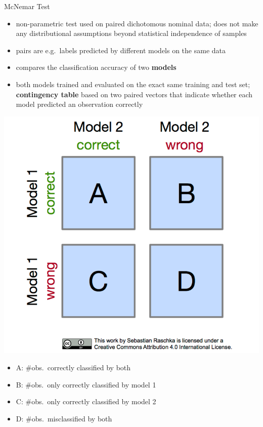     \begin{frame}[c,allowframebreaks]{McNemar Test}
    \begin{itemize}
    \item non-parametric test used on paired dichotomous nominal data; does not
        make any distributional assumptions beyond statistical independence of
        samples
    \item pairs are e.g.\ labels predicted by different models on the same data
    \item compares the classification accuracy of two \textbf{models}
    \item both models trained and evaluated on the exact same training and test set;
        \textbf{contingency table} based on two paired vectors that indicate whether each model predicted an observation correctly
    \end{itemize}

    \medskip
    \begin{minipage}{0.25\textwidth}
    \includegraphics[width=\textwidth]{images/mcnemar_1}
    \end{minipage}
    \begin{minipage}{0.74\textwidth}
    \begin{itemize}
    \item A: $\#$obs.\ correctly classified by both
    \item B: $\#$obs.\ only correctly classified by model 1
    \item C: $\#$obs.\ only correctly classified by model 2
    \item D: $\#$obs.\ misclassified by both
    \end{itemize}
    \end{minipage}


\end{frame}
